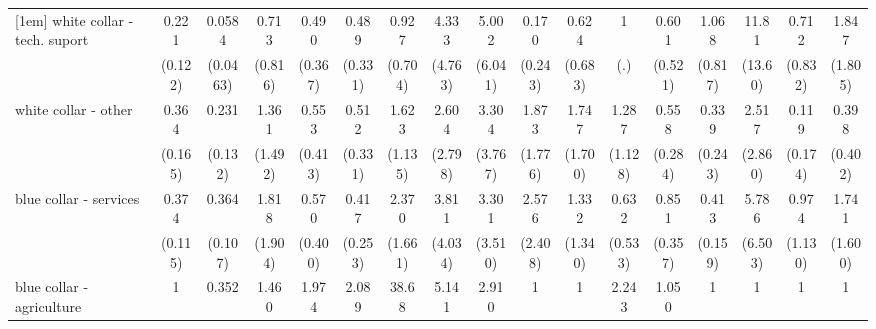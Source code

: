{\begin{tabular}{l*{16}{c}}
[1em]
white collar - tech. suport&       0.221\sym{**} &      0.0584\sym{***}&       0.713         &       0.490         &       0.489         &       0.927         &       4.333         &       5.002         &       0.170         &       0.624         &           1         &       0.601         &       1.068         &       11.81\sym{*}  &       0.712         &       1.847         \\
                    &     (0.122)         &    (0.0463)         &     (0.816)         &     (0.367)         &     (0.331)         &     (0.704)         &     (4.763)         &     (6.041)         &     (0.243)         &     (0.683)         &         (.)         &     (0.521)         &     (0.817)         &     (13.60)         &     (0.832)         &     (1.805)         \\
[1em]
white collar - other&       0.364\sym{*}  &       0.231\sym{*}  &       1.361         &       0.553         &       0.512         &       1.623         &       2.604         &       3.304         &       1.873         &       1.747         &       1.287         &       0.558         &       0.339         &       2.517         &       0.119         &       0.398         \\
                    &     (0.165)         &     (0.132)         &     (1.492)         &     (0.413)         &     (0.331)         &     (1.135)         &     (2.798)         &     (3.767)         &     (1.776)         &     (1.700)         &     (1.128)         &     (0.284)         &     (0.243)         &     (2.860)         &     (0.174)         &     (0.402)         \\
[1em]
blue collar - services&       0.374\sym{**} &       0.364\sym{***}&       1.818         &       0.570         &       0.417         &       2.370         &       3.811         &       3.301         &       2.576         &       1.332         &       0.632         &       0.851         &       0.413\sym{*}  &       5.786         &       0.974         &       1.741         \\
                    &     (0.115)         &     (0.107)         &     (1.904)         &     (0.400)         &     (0.253)         &     (1.661)         &     (4.034)         &     (3.510)         &     (2.408)         &     (1.340)         &     (0.533)         &     (0.357)         &     (0.159)         &     (6.503)         &     (1.130)         &     (1.600)         \\
[1em]
blue collar - agriculture&           1         &       0.352         &       1.460         &       1.974         &       2.089         &       38.68\sym{**} &       5.141         &       2.910         &           1         &           1         &       2.243         &       1.050         &           1         &           1         &           1         &           1         \\

\end{tabular}}
